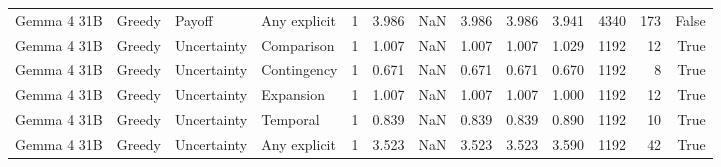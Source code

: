 \begin{tabular}{llllrrrrrrrrr}
Gemma 4 31B & Greedy & Payoff & Any explicit & 1 & 3.986 & NaN & 3.986 & 3.986 & 3.941 & 4340 & 173 & False \\
Gemma 4 31B & Greedy & Uncertainty & Comparison & 1 & 1.007 & NaN & 1.007 & 1.007 & 1.029 & 1192 & 12 & True \\
Gemma 4 31B & Greedy & Uncertainty & Contingency & 1 & 0.671 & NaN & 0.671 & 0.671 & 0.670 & 1192 & 8 & True \\
Gemma 4 31B & Greedy & Uncertainty & Expansion & 1 & 1.007 & NaN & 1.007 & 1.007 & 1.000 & 1192 & 12 & True \\
Gemma 4 31B & Greedy & Uncertainty & Temporal & 1 & 0.839 & NaN & 0.839 & 0.839 & 0.890 & 1192 & 10 & True \\
Gemma 4 31B & Greedy & Uncertainty & Any explicit & 1 & 3.523 & NaN & 3.523 & 3.523 & 3.590 & 1192 & 42 & True \\
\bottomrule
\end{tabular}
